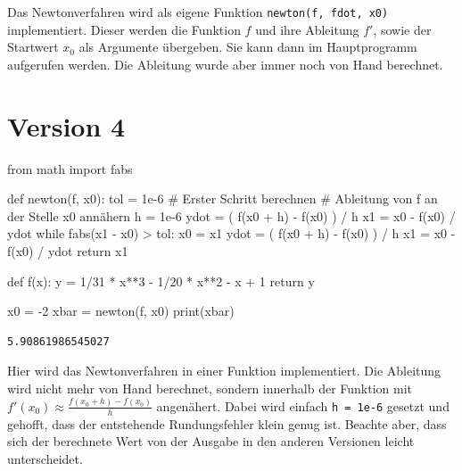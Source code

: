 \documentclass[
  a4paper,
  DIV=11]{scrreprt}
\newenvironment{Shaded}{\begin{snugshade}}{\end{snugshade}}
\newcommand{\BuiltInTok}[1]{\textcolor[rgb]{0.00,0.23,0.31}{#1}}
\newcommand{\CommentTok}[1]{\textcolor[rgb]{0.37,0.37,0.37}{#1}}
\newcommand{\ControlFlowTok}[1]{\textcolor[rgb]{0.00,0.23,0.31}{#1}}
\newcommand{\DecValTok}[1]{\textcolor[rgb]{0.68,0.00,0.00}{#1}}
\newcommand{\FloatTok}[1]{\textcolor[rgb]{0.68,0.00,0.00}{#1}}
\newcommand{\ImportTok}[1]{\textcolor[rgb]{0.00,0.46,0.62}{#1}}
\newcommand{\KeywordTok}[1]{\textcolor[rgb]{0.00,0.23,0.31}{#1}}
\newcommand{\NormalTok}[1]{\textcolor[rgb]{0.00,0.23,0.31}{#1}}
\newcommand{\OperatorTok}[1]{\textcolor[rgb]{0.37,0.37,0.37}{#1}}
\theoremstyle{definition}
\theoremstyle{definition}
\theoremstyle{remark}
\begin{document}
\begin{tcolorbox}
Das Newtonverfahren wird als eigene Funktion
\texttt{newton(f,\ fdot,\ x0)} implementiert. Dieser werden die Funktion
\(f\) und ihre Ableitung \(f'\), sowie der Startwert \(x_0\) als
Argumente übergeben. Sie kann dann im Hauptprogramm aufgerufen werden.
Die Ableitung wurde aber immer noch von Hand berechnet.

\section{Version 4}

\begin{Shaded}
\begin{Highlighting}[]
\ImportTok{from}\NormalTok{ math }\ImportTok{import}\NormalTok{ fabs}

\KeywordTok{def}\NormalTok{ newton(f, x0):}
\NormalTok{    tol }\OperatorTok{=} \FloatTok{1e{-}6}
    \CommentTok{\# Erster Schritt berechnen}
    \CommentTok{\# Ableitung von f an der Stelle x0 annähern}
\NormalTok{    h }\OperatorTok{=} \FloatTok{1e{-}6}
\NormalTok{    ydot }\OperatorTok{=}\NormalTok{ ( f(x0 }\OperatorTok{+}\NormalTok{ h) }\OperatorTok{{-}}\NormalTok{ f(x0) ) }\OperatorTok{/}\NormalTok{ h}
\NormalTok{    x1 }\OperatorTok{=}\NormalTok{ x0 }\OperatorTok{{-}}\NormalTok{ f(x0) }\OperatorTok{/}\NormalTok{ ydot}
    \ControlFlowTok{while}\NormalTok{ fabs(x1 }\OperatorTok{{-}}\NormalTok{ x0) }\OperatorTok{\textgreater{}}\NormalTok{ tol:}
\NormalTok{        x0 }\OperatorTok{=}\NormalTok{ x1}
\NormalTok{        ydot }\OperatorTok{=}\NormalTok{ ( f(x0 }\OperatorTok{+}\NormalTok{ h) }\OperatorTok{{-}}\NormalTok{ f(x0) ) }\OperatorTok{/}\NormalTok{ h}
\NormalTok{        x1 }\OperatorTok{=}\NormalTok{ x0 }\OperatorTok{{-}}\NormalTok{ f(x0) }\OperatorTok{/}\NormalTok{ ydot}
    \ControlFlowTok{return}\NormalTok{ x1}

\KeywordTok{def}\NormalTok{ f(x):}
\NormalTok{    y }\OperatorTok{=} \DecValTok{1}\OperatorTok{/}\DecValTok{31} \OperatorTok{*}\NormalTok{ x}\OperatorTok{**}\DecValTok{3} \OperatorTok{{-}} \DecValTok{1}\OperatorTok{/}\DecValTok{20} \OperatorTok{*}\NormalTok{ x}\OperatorTok{**}\DecValTok{2} \OperatorTok{{-}}\NormalTok{ x }\OperatorTok{+} \DecValTok{1}
    \ControlFlowTok{return}\NormalTok{ y}

\NormalTok{x0 }\OperatorTok{=} \OperatorTok{{-}}\DecValTok{2}
\NormalTok{xbar }\OperatorTok{=}\NormalTok{ newton(f, x0)}
\BuiltInTok{print}\NormalTok{(xbar)}
\end{Highlighting}
\end{Shaded}

\begin{verbatim}
5.90861986545027
\end{verbatim}

Hier wird das Newtonverfahren in einer Funktion implementiert. Die
Ableitung wird nicht mehr von Hand berechnet, sondern innerhalb der
Funktion mit \(f'(x_0)\approx \frac{f(x_0 + h) - f(x_0)}{h}\)
angenähert. Dabei wird einfach \texttt{h\ =\ 1e-6} gesetzt und gehofft,
dass der entstehende Rundungsfehler klein genug ist. Beachte aber, dass
sich der berechnete Wert von der Ausgabe in den anderen Versionen leicht
unterscheidet.

\end{tcolorbox}
\end{document}
